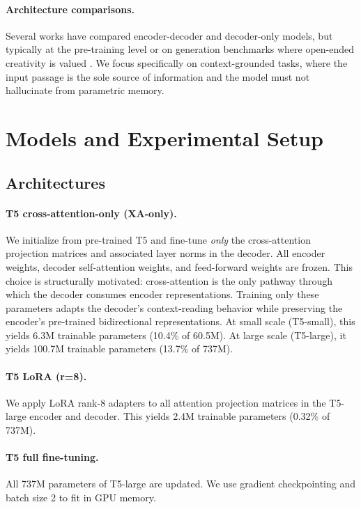 \documentclass[11pt]{article}
\begin{document}
\paragraph{Architecture comparisons.}
Several works have compared encoder-decoder and decoder-only models, but typically
at the pre-training level or on generation benchmarks where open-ended creativity
is valued \citep{tay2022ul2}.
We focus specifically on context-grounded tasks, where the input passage is the
sole source of information and the model must not hallucinate from parametric memory.

\section{Models and Experimental Setup}

\subsection{Architectures}

\paragraph{T5 cross-attention-only (XA-only).}
We initialize from pre-trained T5 and fine-tune \emph{only} the cross-attention
projection matrices and associated layer norms in the decoder.
All encoder weights, decoder self-attention weights, and feed-forward weights are
frozen.
This choice is structurally motivated: cross-attention is the only pathway through
which the decoder consumes encoder representations.
Training only these parameters adapts the decoder's context-reading behavior
while preserving the encoder's pre-trained bidirectional representations.
At small scale (T5-small), this yields 6.3M trainable parameters (10.4\% of 60.5M).
At large scale (T5-large), it yields 100.7M trainable parameters (13.7\% of 737M).

\paragraph{T5 LoRA (r=8).}
We apply LoRA \citep{hu2022lora} rank-8 adapters to all attention projection
matrices in the T5-large encoder and decoder.
This yields 2.4M trainable parameters (0.32\% of 737M).

\paragraph{T5 full fine-tuning.}
All 737M parameters of T5-large are updated.
We use gradient checkpointing and batch size 2 to fit in GPU memory.
\end{document}
